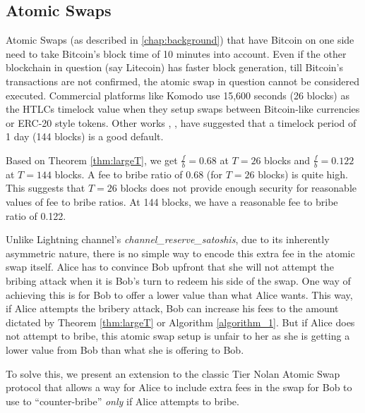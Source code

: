\subsection{Atomic Swaps}
Atomic Swaps (as described in \ref{chap:background}) that have Bitcoin on one side need to take Bitcoin's block time of 10 minutes into account. Even if the other blockchain in question (say Litecoin) has faster block generation, till Bitcoin's transactions are not confirmed, the atomic swap in question cannot be considered executed. Commercial platforms like Komodo \cite{komodo} use 15,600 seconds (26 blocks) as the HTLCs timelock value when they setup swaps between Bitcoin-like currencies or ERC-20 style tokens. Other works \cite{atomic_swaps_american_call_options}, \cite{atomic_swaps_bitmex}, \cite{htlcs_considered_harmful} have suggested that a timelock period of 1 day (144 blocks) is a good default. 

Based on Theorem \ref{thm:largeT}, we get $\frac{f}{b} = 0.68$ at $T = 26$ blocks and $\frac{f}{b} = 0.122$ at $T = 144$ blocks. A fee to bribe ratio of 0.68 (for $T = 26$ blocks) is quite high. This suggests that $T = 26$ blocks does not provide enough security for reasonable values of fee to bribe ratios. At 144 blocks, we have a reasonable fee to bribe ratio of 0.122. 

Unlike Lightning channel's \emph{channel\_reserve\_satoshis}, due to its inherently asymmetric nature, there is no simple way to encode this extra fee in the atomic swap itself. Alice has to convince Bob upfront that she will not attempt the bribing attack when it is Bob's turn to redeem his side of the swap. One way of achieving this is for Bob to offer a lower value than what Alice wants. This way, if Alice attempts the bribery attack, Bob can increase his \sellertxn{} fees to the amount dictated by Theorem \ref{thm:largeT} or Algorithm \ref{algorithm_1}. But if Alice does not attempt to bribe, this atomic swap setup is unfair to her as she is getting a lower value from Bob than what she is offering to Bob.

To solve this, we present an extension to the classic Tier Nolan Atomic Swap protocol that allows a way for Alice to include extra fees in the swap for Bob to use to ``counter-bribe'' \textit{only} if Alice attempts to bribe.


